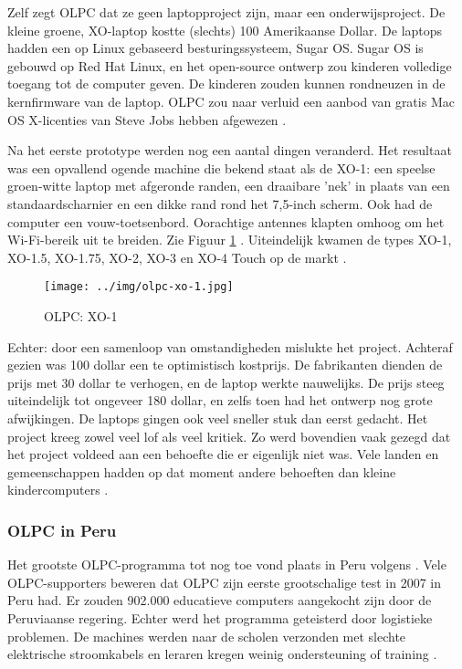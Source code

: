 Zelf zegt OLPC dat ze geen laptopproject zijn, maar een onderwijsproject. De kleine groene, XO-laptop kostte (slechts) 100 Amerikaanse Dollar. De laptops hadden een op Linux gebaseerd besturingssysteem, Sugar OS. Sugar OS is gebouwd op Red Hat Linux, en het open-source ontwerp zou kinderen volledige toegang tot de computer geven. De kinderen zouden kunnen rondneuzen in de kernfirmware van de laptop. OLPC zou naar verluid een aanbod van gratis Mac OS X-licenties van Steve Jobs hebben afgewezen \autocite{Robertson2018}.

Na het eerste prototype werden nog een aantal dingen veranderd. Het resultaat was een opvallend ogende machine die bekend staat als de XO-1: een speelse groen-witte laptop met afgeronde randen, een draaibare 'nek' in plaats van een standaardscharnier en een dikke rand rond het 7,5-inch scherm. Ook had de computer een vouw-toetsenbord. Oorachtige antennes klapten omhoog om het Wi-Fi-bereik uit te breiden. Zie Figuur \ref{xo-1} \autocite{Robertson2018}. Uiteindelijk kwamen de types XO-1, XO-1.5, XO-1.75, XO-2, XO-3 en XO-4 Touch op de markt \autocite{OLPC2016}.

 \begin{figure}[h!]
	\texttt{[image: ../img/olpc-xo-1.jpg]}
	\caption{OLPC: XO-1} \autocite{OneLaptopPerChild2005}
	\label{xo-1}
\end{figure}

Echter: door een samenloop van omstandigheden mislukte het project. Achteraf gezien was 100 dollar een te optimistisch kostprijs. De fabrikanten dienden de prijs met 30 dollar te verhogen, en de laptop werkte nauwelijks. De prijs steeg uiteindelijk tot ongeveer 180 dollar, en zelfs toen had het ontwerp nog grote afwijkingen. De laptops gingen ook veel sneller stuk dan eerst gedacht. Het project kreeg zowel veel lof als veel kritiek. Zo werd bovendien vaak gezegd dat het project voldeed aan een behoefte die er eigenlijk niet was. Vele landen en gemeenschappen hadden op dat moment andere behoeften dan kleine kindercomputers \autocite{Robertson2018}.

\subsubsection{OLPC in Peru}
\label{olpc-in-peru}
Het grootste OLPC-programma tot nog toe vond plaats in Peru volgens \autocite{Trucano2012}. Vele OLPC-supporters beweren dat OLPC zijn eerste grootschalige test in 2007 in Peru had. Er zouden 902.000 educatieve computers aangekocht zijn door de Peruviaanse regering. Echter werd het programma geteisterd door logistieke problemen. De machines werden naar de scholen verzonden met slechte elektrische stroomkabels en leraren kregen weinig ondersteuning of training \autocite{Robertson2018}.

